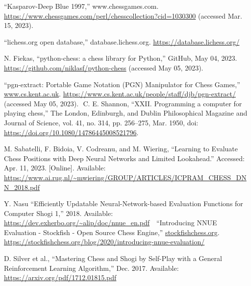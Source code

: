 \documentclass[conference]{IEEEtran}
\begin{document}
\begin{thebibliography}{00}
“Kasparov-Deep Blue 1997,” www.chessgames.com. \url{https://www.chessgames.com/perl/chesscollection?cid=1030300} (accessed Mar. 15, 2023).

“lichess.org open database,” database.lichess.org. \url{https://database.lichess.org/}

N. Fiekas, “python-chess: a chess library for Python,” GitHub, May 04, 2023. \url{https://github.com/niklasf/python-chess} (accessed May 05, 2023).

“pgn-extract: Portable Game Notation (PGN) Manipulator for Chess Games,” \url{www.cs.kent.ac.uk}. \url{https://www.cs.kent.ac.uk/people/staff/djb/pgn-extract/} (accessed May 05, 2023).
‌
C. E. Shannon, “XXII. Programming a computer for playing chess,” The London, Edinburgh, and Dublin Philosophical Magazine and Journal of Science, vol. 41, no. 314, pp. 256–275, Mar. 1950, doi: \url{https://doi.org/10.1080/14786445008521796}.

M. Sabatelli, F. Bidoia, V. Codreanu, and M. Wiering, “Learning to Evaluate Chess Positions with Deep Neural Networks and Limited Lookahead.” Accessed: Apr. 11, 2023. [Online]. Available: \url{https://www.ai.rug.nl/~mwiering/GROUP/ARTICLES/ICPRAM_CHESS_DNN_2018.pdf}

Y. Nasu “Efficiently Updatable Neural-Network-based Evaluation Functions for Computer Shogi 1,” 2018. Available: \url{https://dev.exherbo.org/~alip/doc/nnue_en.pdf}
‌
‌ “Introducing NNUE Evaluation - Stockfish - Open Source Chess Engine,” \url{stockfishchess.org}. \url{https://stockfishchess.org/blog/2020/introducing-nnue-evaluation/}

 D. Silver et al., “Mastering Chess and Shogi by Self-Play with a General Reinforcement Learning Algorithm,” Dec. 2017. Available: \url{https://arxiv.org/pdf/1712.01815.pdf}

\end{thebibliography}
\end{document}
